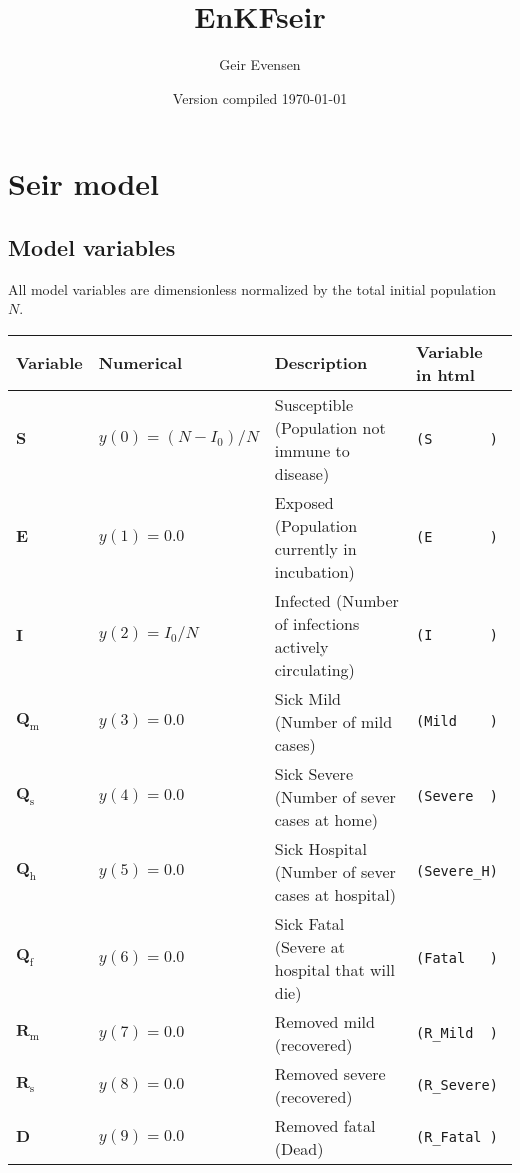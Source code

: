 \documentclass[twoside,11pt]{article}
\newcommand{\rmf}{\mathrm{f}}
\newcommand{\rmh}{\mathrm{h}}
\newcommand{\rmm}{\mathrm{m}}
\newcommand{\rms}{\mathrm{s}}
\newcommand{\bmD}{{\mathbf{D}}}
\newcommand{\bmE}{{\mathbf{E}}}
\newcommand{\bmI}{{\mathbf{I}}}
\newcommand{\bmQ}{{\mathbf{Q}}}
\newcommand{\bmR}{{\mathbf{R}}}
\newcommand{\bmS}{{\mathbf{S}}}
\begin{document}
\setlength{\parskip}{3mm} 

\title{EnKFseir}
\author{Geir Evensen}

\date{Version compiled \today}

\maketitle


\section{Seir model\label{sec:model}}

\subsection{Model variables}
All model variables are dimensionless normalized by the total initial population $N$.
\begin{center}
\begin{tabular}{llll}
\hline
 Variable&  Numerical             & Description                                             & Variable in html  \\
\hline
 $\bmS     $ & $y(0) = (N-I_0)/N$ & Susceptible (Population not immune to disease)          & \verb+(S       )+ \\
 $\bmE     $ & $y(1) = 0.0      $ & Exposed     (Population currently in incubation)        & \verb+(E       )+ \\
 $\bmI     $ & $y(2) = I_0/N    $ & Infected    (Number of infections actively circulating) & \verb+(I       )+ \\
 $\bmQ_\rmm$ & $y(3) = 0.0      $ & Sick Mild   (Number of mild cases)                      & \verb+(Mild    )+ \\
 $\bmQ_\rms$ & $y(4) = 0.0      $ & Sick Severe (Number of sever cases at home)             & \verb+(Severe  )+ \\
 $\bmQ_\rmh$ & $y(5) = 0.0      $ & Sick Hospital (Number of sever cases at hospital)       & \verb+(Severe_H)+ \\
 $\bmQ_\rmf$ & $y(6) = 0.0      $ & Sick Fatal   (Severe at hospital that will die)         & \verb+(Fatal   )+ \\
 $\bmR_\rmm$ & $y(7) = 0.0      $ & Removed mild   (recovered)                              & \verb+(R_Mild  )+ \\
 $\bmR_\rms$ & $y(8) = 0.0      $ & Removed severe (recovered)                              & \verb+(R_Severe)+ \\
 $\bmD     $ & $y(9) = 0.0      $ & Removed fatal (Dead)                                    & \verb+(R_Fatal )+ \\
\hline
\end{tabular}
\end{center}
\end{document}
